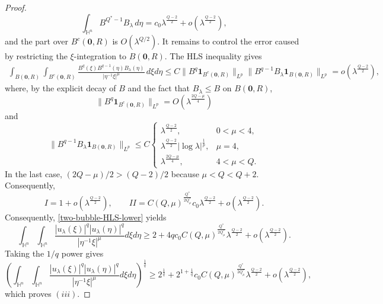 \documentclass[10pt,a4paper]{amsart}
\begin{document}
\begin{proof}
{\[
 \int_{\mathbb H^n}B^{Q^{\ast}-1}B_\lambda\,d\eta
 =c_0\lambda^{\frac{Q-2}{2}}+o\!\left(\lambda^{\frac{Q-2}{2}}\right),
\]
and the part over $B^c(\mathbf0,R)$ is $O(\lambda^{Q/2})$. It remains to control the error caused by restricting the $\xi$-integration to $B(\mathbf0,R)$. The HLS inequality gives
\begin{align*}
 \int_{B(\mathbf0,R)}\int_{B^c(\mathbf0,R)}
 \frac{B^q(\xi)B^{q-1}(\eta)B_\lambda(\eta)}{|\eta^{-1}\xi|^\mu}
 \,d\xi d\eta\leq C\|B^q\mathbf1_{B^c(\mathbf0,R)}\|_{L^p}
 \|B^{q-1}B_\lambda\mathbf1_{B(\mathbf0,R)}\|_{L^p}
 =o\!\left(\lambda^{\frac{Q-2}{2}}\right),
\end{align*}
where, by the explicit decay of $B$ and the fact that $B_\lambda\leq B$ on $B(\mathbf0,R)$,
\[
 \|B^q\mathbf1_{B^c(\mathbf0,R)}\|_{L^p}
 =O\!\left(\lambda^{\frac{2Q-\mu}{4}}\right)
\]
and
\[
 \|B^{q-1}B_\lambda\mathbf1_{B(\mathbf0,R)}\|_{L^p}
 \leq C\begin{cases}
 \lambda^{\frac{Q-2}{2}},&0<\mu<4,\\
 \lambda^{\frac{Q-2}{2}}|\log\lambda|^{\frac{1}{p}},&\mu=4,\\
 \lambda^{\frac{2Q-\mu}{4}},&4<\mu<Q.
 \end{cases}
\]
In the last case, $(2Q-\mu)/2>(Q-2)/2$ because $\mu<Q<Q+2$. Consequently,
\[
 I=1+o\!\left(\lambda^{\frac{Q-2}{2}}\right),\qquad
 II=C(Q,\mu)^{\frac{Q^{\ast}}{2Q^{\ast}_{\mu}}}c_0\lambda^{\frac{Q-2}{2}}
 +o\!\left(\lambda^{\frac{Q-2}{2}}\right).
\]
Consequently, \eqref{two-bubble-HLS-lower} yields
\[
 \int_{\mathbb{H}^{n}}\int_{\mathbb{H}^{n}}\frac{|u_\lambda(\xi)|^q|u_\lambda(\eta)|^q}{|\eta^{-1}\xi|^\mu}{d}\xi{d}\eta
 \geq 2+4q c_0C(Q,\mu)^{\frac{Q^{\ast}}{2Q^{\ast}_{\mu}}}\lambda^{\frac{Q-2}{2}}
 +o\!\left(\lambda^{\frac{Q-2}{2}}\right).
\]
Taking the $1/q$ power gives
\[
 \left(\int_{\mathbb{H}^{n}}\int_{\mathbb{H}^{n}}\frac{|u_\lambda(\xi)|^q|u_\lambda(\eta)|^q}{|\eta^{-1}\xi|^\mu}{d}\xi{d}\eta\right)^{\frac{1}{q}}
 \geq 2^{\frac{1}{q}}+2^{1+\frac{1}{q}}c_0C(Q,\mu)^{\frac{Q^{\ast}}{2Q^{\ast}_{\mu}}}\lambda^{\frac{Q-2}{2}}
 +o\!\left(\lambda^{\frac{Q-2}{2}}\right),
\]
which proves $(iii)$.}
\end{proof}
\end{document}
